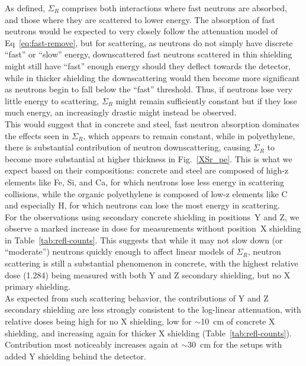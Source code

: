 \documentclass[12pt]{article}
\newcommand{\figref}[1]{Fig.~\ref{#1}}
\newcommand{\XSr}{\Sigma_R}
\begin{document}
As defined, $\XSr$ comprises both interactions where fast neutrons are absorbed, and those where they are scattered to lower energy.
The absorption of fast neutrons would be expected to very closely follow the attenuation model of Eq~\ref{eq:fast-remove}, but for scattering, as neutrons do not simply have discrete ``fast'' or ``slow'' energy, downscattered fast neutrons scattered in thin shielding might still have ``fast'' enough energy should they deflect towards the detector, while in thicker shielding the downscattering would then become more significant as neutrons begin to fall below the ``fast'' threshold.
Thus, if neutrons lose very little energy to scattering, $\XSr$ might remain sufficiently constant but if they lose much energy, an increasingly drastic might instead be observed.\\

This would suggest that in concrete and steel, fast neutron absorption dominates the effects seen in $\XSr$, which appears to remain constant, while in polyethylene, there is substantial contribution of neutron downscattering, causing $\XSr$ to become more substantial at higher thickness in \figref{XSr_pe}.
This is what we expect based on their compositions: concrete and steel are composed of high-z elements like Fe, Si, and Ca, for which neutrons lose less energy in scattering collisions\cite{yip_nuclear_2025}, while the organic polyethylene is composed of low-z elements like C and especially H, for which neutrons can lose the most energy in scattering\cite{yip_nuclear_2025}.\\

For the observations using secondary concrete shielding in positions~Y and Z, we observe a marked increase in dose for measurements without position~X shielding in Table~\ref{tab:refl-counts}.
This suggests that while it may not slow down (or ``moderate'') neutrons quickly enough to affect linear models of $\XSr$, neutron scattering is still a substantial phenomenon in concrete, with the highest relative dose (1.284) being measured with both Y and Z secondary shielding, but no X primary shielding.\\

As expected from such scattering behavior, the contributions of Y and Z secondary shielding are less strongly consistent to the log-linear attenuation, with relative doses being high for no X shielding, low for $\sim$10~cm of concrete X shielding, and increasing again for thicker X shielding (Table~\ref{tab:refl-counts}).
Contribution most noticeably increases again at $\sim$30~cm for the setups with added Y shielding behind the detector.\\
\end{document}
